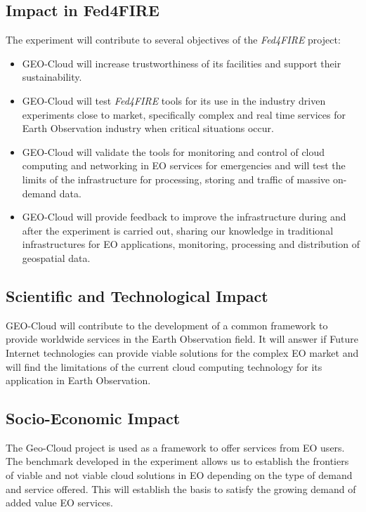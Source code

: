 \subsection{Impact in Fed4FIRE}
The experiment will contribute to several objectives of the \emph{Fed4FIRE}
project:
\begin{itemize}
\item GEO-Cloud will increase trustworthiness of its facilities and support their
sustainability.
\item GEO-Cloud will test \emph{Fed4FIRE} tools for its use in the industry
driven experiments close to market, specifically complex and real time services
for Earth Observation industry when critical situations occur.
\item GEO-Cloud will validate the tools for monitoring and control of cloud computing
and networking in EO services for emergencies and will test the limits of the
infrastructure for processing, storing and traffic of massive on-demand
data.
\item GEO-Cloud will provide feedback to improve the infrastructure during and
after the experiment is carried out, sharing our knowledge in traditional
infrastructures for \ac{EO} applications, monitoring, processing and
distribution of geospatial data.
\end{itemize}

\subsection{Scientific and Technological Impact}

GEO-Cloud will contribute to the development of a common framework to provide worldwide services in the Earth
Observation field. It will answer if Future Internet technologies can provide
viable solutions for the complex \ac{EO} market and will find the limitations of
the current cloud computing technology for its application in Earth Observation.

\subsection{Socio-Economic Impact}

The Geo-Cloud project is used as a framework to offer services from \ac{EO}
users. The benchmark developed in the experiment allows us to establish the
frontiers of viable and not viable cloud solutions in \ac{EO} depending on the
type of demand and service offered. This will establish the basis to satisfy the
growing demand of added value \ac{EO} services.

